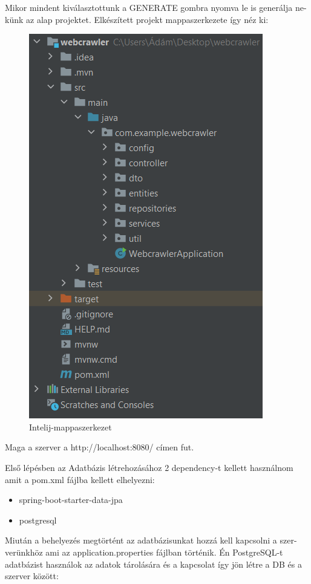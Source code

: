 Mikor mindent kiválasztottunk a GENERATE gombra nyomva le is generálja ne-
künk az alap projektet.
\newpage
Elkészített projekt mappaszerkezete így néz ki:
\begin{figure}[h]
\centering
\includegraphics[scale=0.7]{images/Intelij-mappaszerkezet.png}
\caption{Intelij-mappaszerkezet}
\label{fig:Intelij-mappaszerkezet}
\end{figure}

Maga a szerver a http://localhost:8080/ címen fut.


Első lépésben az Adatbázis létrehozásához 2 dependency-t kellett használnom amit a pom.xml fájlba kellett elhelyezni:
\begin{itemize}
\item spring-boot-starter-data-jpa
\item postgresql
\end{itemize}

Miután a behelyezés megtörtént az adatbázisunkat hozzá kell kapcsolni a szer-
verünkhöz ami az application.properties fájlban történik. Én PostgreSQL-t adatbázist használok az adatok tárolására és a kapcsolat így jön létre a DB és a szerver között:

